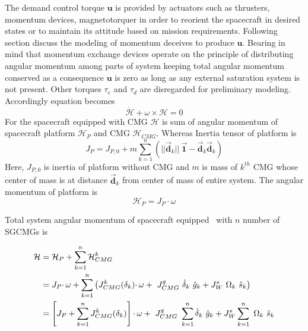 \noindent The demand control torque $\displaystyle \mathbf{u}$ is provided by actuators such as thrusters, momentum devices, magnetotorquer in order to reorient the spacecraft in desired states or to maintain its attitude based on mission requirements. Following section discuss the modeling of momentum deceives to produce $\displaystyle \mathbf{u}$. Bearing in mind that momentum exchange devices operate on the principle of distributing angular momentum among parts of system keeping total angular momentum conserved as a consequence $\displaystyle \mathbf{u}$ is zero as long as any external saturation system is not present. Other torques $\displaystyle \tau _{e}$ and $\displaystyle \tau _{d}$ are disregarded for preliminary modeling. Accordingly equation becomes
\begin{equation}
\dot{\mathcal{H}} +\omega \times \mathcal{H} = 0
\label{eqn:TorqueFreeEOM}
\end{equation}
For the spacecraft equipped with CMG $\displaystyle \mathcal{H}$ is sum of angular momentum of spacecraft platform $\displaystyle \mathcal{H}_{P}$ and CMG $\displaystyle \mathcal{H}_{CMG}$. Whereas Inertia tensor of platform is
\begin{equation}
J_{P} =J_{P,0} +m\sum ^{n}_{k=1}( ||\vec{\mathbf{d}}_{k} ||\ \vec{\mathbf{1}} -\vec{\mathbf{d}}_{k}\vec{\mathbf{d}}_{k})
\end{equation}
Here, $\displaystyle J_{P,0}$ is inertia of platform without CMG and $\displaystyle m$ is mass of $\displaystyle k^{th}$ CMG whose center of mass is at distance $\displaystyle \vec{\mathbf{d}}_{k}$ from center of mass of entire system. The angular momentum of platform is
\begin{equation}
\mathcal{H}_{P} =J_{P} \cdotp \omega 
\end{equation}

Total system angular momentum of spacecraft equipped \ with $\displaystyle n$ number of SGCMGs is 
\begin{tcolorbox}
\begin{equation}
\begin{aligned}
\mathcal{H} & =\mathcal{H}_{P} +\sum ^{n}_{k=1}\mathcal{H}^{k}_{CMG}\\
 & =J_{P} \cdotp \omega +\sum ^{n}_{k=1}\left( J^{k}_{CMG}( \delta_{k}) \cdotp \omega +\ J^{g}_{CMG} \ \dot{\delta}_{k} \ \hat{g}_{k} +J^{s}_{W} \ \Omega _{k} \ \hat{s}_{k}\right)\\
 & =\left[ J_{P} +\sum ^{n}_{k=1} J^{k}_{CMG}( \delta_{k})\right] \cdotp \omega +\ J^{g}_{CMG} \ \sum ^{n}_{k=1}\dot{\delta}_{k} \ \hat{g}_{k} +J^{s}_{W}\sum ^{n}_{k=1} \ \Omega _{k} \ \hat{s}_{k}
\end{aligned}\\
\label{eqn:H_Total}
\end{equation}
\end{tcolorbox}

